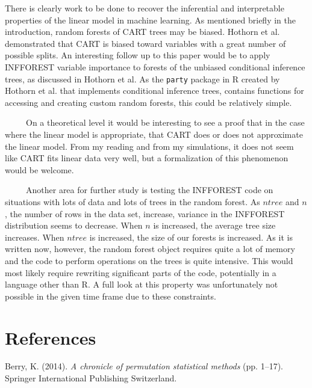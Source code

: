\documentclass[12pt,twoside]{reedthesis}
\begin{document}
  There is clearly work to be done to recover the inferential and
  interpretable properties of the linear model in machine learning. As
  mentioned briefly in the introduction, random forests of CART trees may
  be biased. Hothorn et al. demonstrated that CART is biased toward
  variables with a great number of possible splits. An interesting follow
  up to this paper would be to apply INFFOREST variable importance to
  forests of the unbiased conditional inference trees, as discussed in
  Hothorn et al. As the \texttt{party} package in R created by Hothorn et
  al. that implements conditional inference trees, contains functions for
  accessing and creating custom random forests, this could be relatively
  simple.
  
  ~~~~~On a theoretical level it would be interesting to see a proof that
  in the case where the linear model is appropriate, that CART does or
  does not approximate the linear model. From my reading and from my
  simulations, it does not seem like CART fits linear data very well, but
  a formalization of this phenomenon would be welcome.
  
  ~~~~~Another area for further study is testing the INFFOREST code on
  situations with lots of data and lots of trees in the random forest. As
  \(ntree\) and \(n\), the number of rows in the data set, increase,
  variance in the INFFOREST distribution seems to decrease. When \(n\) is
  increased, the average tree size increases. When \(ntree\) is increased,
  the size of our forests is increased. As it is written now, however, the
  random forest object requires quite a lot of memory and the code to
  perform operations on the trees is quite intensive. This would most
  likely require rewriting significant parts of the code, potentially in a
  language other than R. A full look at this property was unfortunately
  not possible in the given time frame due to these constraints.
  
  \backmatter
  
  \chapter{References}\label{references}
  
  \noindent
  
  \setlength{\parindent}{-0.20in} \setlength{\leftskip}{0.20in}
  \setlength{\parskip}{8pt}
  
  \hypertarget{refs}{}
  \hypertarget{ref-berry}{}
  Berry, K. (2014). \emph{A chronicle of permutation statistical methods}
  (pp. 1--17). Springer International Publishing Switzerland.
  
\end{document}
